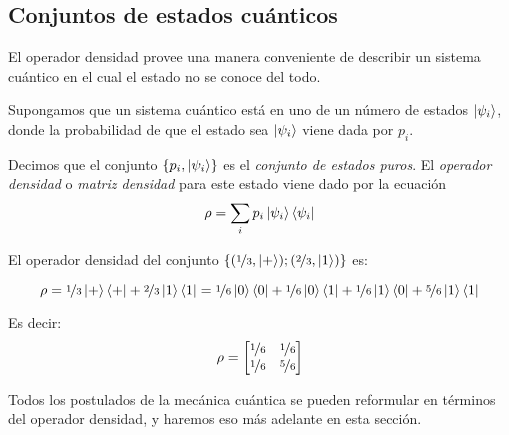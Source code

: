 \subsection{Conjuntos de estados cuánticos}
El operador densidad provee una manera conveniente de describir un sistema
cuántico en el cual el estado no se conoce del todo.

\begin{definicion}
   Supongamos que un sistema cuántico está en uno de
  un número de estados $\ket{\psi_i}$, donde la probabilidad de que el estado
  sea $\ket{\psi_i}$ viene dada por $p_i$.

  Decimos que el conjunto $\{p_i,\ket{\psi_i}\}$ es el \emph{conjunto de estados
    puros}. El \emph{operador densidad} o \emph{matriz densidad} para este
  estado viene dado por la ecuación
  \[
    \rho = \sum_i p_i\ket{\psi_i}\bra{\psi_i}
  \]
\end{definicion}
\begin{ejemplo}
  \label{ex:OpDens}
  El operador densidad del conjunto $\{(\nicefrac 13,\ket+);(\nicefrac 23,\ket 1)\}$ es:
  
  \begin{equation*}
    \rho=\nicefrac 13\ket +\bra ++\nicefrac 23\ket 1\bra 1 = \nicefrac 16\ket
    0\bra 0+\nicefrac 16\ket 0\bra 1+\nicefrac 16\ket 1\bra 0+\nicefrac 56\ket
    1\bra 1
  \end{equation*}

  
  Es decir:
  \[
    \rho = \begin{bmatrix}\nicefrac 16 & \nicefrac 16\\\nicefrac 16 &\nicefrac 56\end{bmatrix}
  \]
\end{ejemplo}

\begin{observacion}
  Todos los postulados de la mecánica cuántica se pueden reformular en términos
  del operador densidad, y haremos eso más adelante en esta sección.
\end{observacion}

